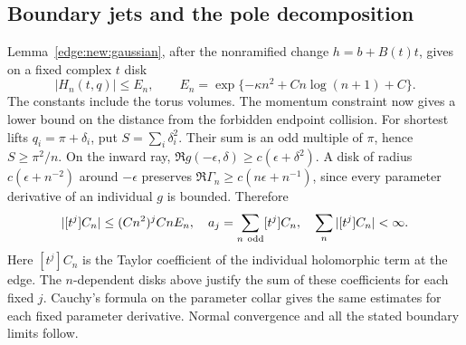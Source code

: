 \documentclass[11pt]{article}
\numberwithin{equation}{section}
\theoremstyle{definition}
\begin{document}
\subsection{Boundary jets and the pole decomposition}

Lemma~\ref{edge:new:gaussian},
after the nonramified change
$h=b+B(t)t$, gives on a fixed complex $t$ disk
\begin{equation}
          |H_n(t,q)|\le E_n,\qquad
 E_n=\exp\{-\kappa n^2+Cn\log(n+1)+C\}.                  \label{neg:new:gauss}
\end{equation}
The constants include the torus volumes.  The momentum constraint now
gives a lower bound on the distance from the forbidden endpoint collision.
For shortest lifts
$q_i=\pi+\delta_i$, put $S=\sum_i\delta_i^2$.
Their sum is an odd multiple of $\pi$, hence $S\ge\pi^2/n$.
On the inward ray,
$\Re g(-\epsilon,\delta)\ge c(\epsilon+\delta^2)$.
A disk of radius $c(\epsilon+n^{-2})$ around $-\epsilon$ preserves
$\Re\Gamma_n\ge c(n\epsilon+n^{-1})$, since every parameter
derivative of an individual $g$ is bounded.  Therefore
\begin{equation}
 |[t^j]C_n|\le(Cn^2)^j CnE_n,\quad
 a_j=\sum_{n\ {\rm odd}}[t^j]C_n,\quad
 \sum_n|[t^j]C_n|<\infty.                              \label{neg:new:jets}
\end{equation}
Here $[t^j]C_n$ is the Taylor coefficient of the individual
holomorphic term at the edge. The $n$-dependent disks above justify
the sum of these coefficients for each fixed $j$.
Cauchy's formula on the parameter collar gives the same estimates for
each fixed parameter derivative.  Normal convergence and all the stated
boundary limits follow.
\end{document}
